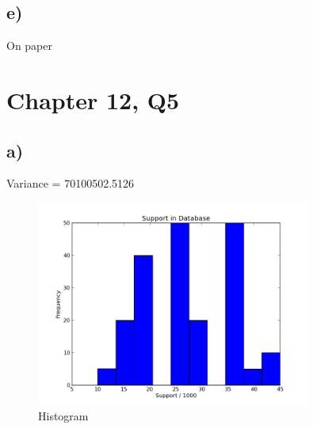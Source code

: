 \documentclass[a4paper,11pt,oneside]{article}
\begin{document}
\subsection*{e)}
On paper

\section*{Chapter 12, Q5}
\subsection*{a)}
Variance = 70100502.5126

\begin{figure}[h]
  \caption{Histogram}
  \centering
    \includegraphics[width=0.8\textwidth]{cap12q5_a.png}
\end{figure}
\end{document}
